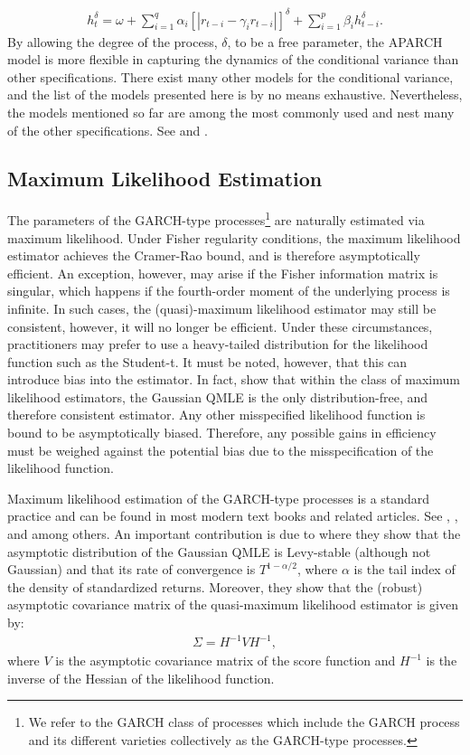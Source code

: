 \documentclass{article} %
\begin{document}
	\begin{align}
		h_t^\delta = \omega + \sum_{i=1}^q \alpha_i \left[ |r_{t-i} - \gamma_i r_{t-i} | \right]^\delta + \sum_{i=1}^p \beta_i h_{t-i}^\delta.
	\end{align}
	By allowing the degree of the process, $\delta$, to be a free parameter, the APARCH model is more flexible in capturing the dynamics of the conditional variance than other specifications. There exist many other models for the conditional variance, and the list of the models presented here is by no means exhaustive. Nevertheless, the models mentioned so far are among the most commonly used and nest many of the other specifications. See \textcite{DING199383} and \textcite{HENTSCHEL199571}.
	
	\subsection{Maximum Likelihood Estimation}
	The parameters of the GARCH-type processes\footnote{We refer to the GARCH class of processes which include the GARCH process and its different varieties collectively as the GARCH-type processes.} are naturally estimated via maximum likelihood. Under Fisher regularity conditions, the maximum likelihood estimator achieves the Cramer-Rao bound, and is therefore asymptotically efficient. An exception, however, may arise if the Fisher information matrix is singular, which happens if the fourth-order moment of the underlying process is infinite. In such cases, the (quasi)-maximum likelihood estimator may still be consistent, however, it will no longer be efficient. Under these circumstances, practitioners may prefer to use a heavy-tailed distribution for the likelihood function such as the Student-t. It must be noted, however, that this can introduce bias into the estimator. In fact, \textcite{HALLYAO2003} show that  within the class of maximum likelihood estimators, the Gaussian QMLE is the only distribution-free, and therefore consistent estimator. Any other misspecified likelihood function is bound to be asymptotically biased. Therefore, any possible gains in efficiency must be weighed against the potential bias due to the misspecification of the likelihood function.
	
	Maximum likelihood estimation of the GARCH-type processes is a standard practice and can be found in most modern text books and related articles. See \textcite{HAMILTON1994}, \textcite{ENGLE1982}, and \textcite{BOLLERSLEV1986307} among others. An important contribution is due to \textcite{HALLYAO2003} where they show that the asymptotic distribution of the Gaussian QMLE is Levy-stable (although not Gaussian) and that its rate of convergence is $T^{1-\alpha/2}$, where $\alpha$ is the tail index of the density of standardized returns. Moreover, they show that the (robust) asymptotic covariance matrix of the quasi-maximum likelihood estimator is given by:
	\begin{align}
		\Sigma = H^{-1} V H^{-1},
	\end{align}
	where $V$ is the asymptotic covariance matrix of the score function and $H^{-1}$ is the inverse of the Hessian of the likelihood function. 
	
\end{document}
